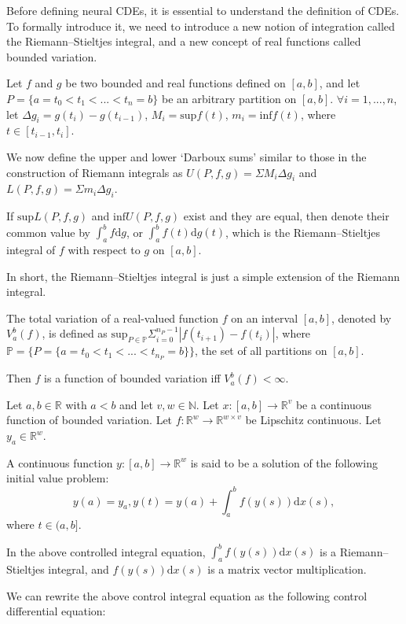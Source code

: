 \documentclass[a4paper,11pt,titlepage]{article}
\theoremstyle{definition}
\theoremstyle{plain}
\theoremstyle{remark}
\begin{document}
Before defining neural CDEs, it is essential to understand the definition of CDEs. To formally introduce it, we need to introduce a new notion of integration called the Riemann–Stieltjes integral, and a new concept of real functions called bounded variation.

Let $f$ and $g$ be two bounded and real functions defined on $[a,b]$, and let $P=\{a=t_0<t_1<...<t_n=b\}$ be an arbitrary partition on $[a,b]$. $\forall i = 1,...,n$, let $\Delta g_i = g(t_i) - g(t_{i-1})$, $M_i=\mathrm{sup}f(t)$, $m_i=\mathrm{inf}f(t)$, where $t\in[t_{i-1},t_i]$.

We now define the upper and lower ‘Darboux sums’ similar to those in the construction of Riemann integrals as $U(P,f,g)=\Sigma M_i\Delta g_i$ and $L(P,f,g)=\Sigma m_i\Delta g_i$.

If $\mathrm{sup}L(P,f,g)$ and $\mathrm{inf}U(P,f,g)$ exist and they are equal, then denote their common value by $\int^b_af\mathrm{d}g$, or $\int^b_af(t)\mathrm{d}g(t)$, which is the Riemann–Stieltjes integral of $f$ with respect to $g$ on $[a,b]$.

In short, the Riemann–Stieltjes integral is just a simple extension of the Riemann integral.

The total variation of a real-valued function $f$ on an interval $[a,b]$, denoted by $V_a^b(f)$, is defined as $\mathrm{sup}_{P\in\mathbb{P}}\Sigma_{i=0}^{n_P-1}|f(t_{i+1})-f(t_i)|$, where $\mathbb{P}=\{P=\{a=t_0<t_1<...<t_{n_P}=b\}\}$, the set of all partitions on $[a,b]$.

Then $f$ is a function of bounded variation iff $V_a^b(f)<\infty$.

Let $a,b\in\mathbb{R}$ with $a<b$ and let $v,w\in\mathbb{N}$. Let $x:[a,b]\rightarrow\mathbb{R}^v$ be a continuous function of bounded variation. Let $f:\mathbb{R}^w\rightarrow\mathbb{R}^{w\times v}$ be Lipschitz continuous. Let $y_a\in\mathbb{R}^w$.

A continuous function $y:[a,b]\rightarrow\mathbb{R}^w$ is said to be a solution of the following initial value problem:
$$y(a)=y_a, y(t)=y(a)+\int_a^bf(y(s))\mathrm{d}x(s),$$
where $t\in(a,b].$

In the above controlled integral equation, $\int_a^bf(y(s))\mathrm{d}x(s)$ is a Riemann–Stieltjes integral, and $f(y(s))\mathrm{d}x(s)$ is a matrix vector multiplication.

We can rewrite the above control integral equation as the following control differential equation:
\end{document}
